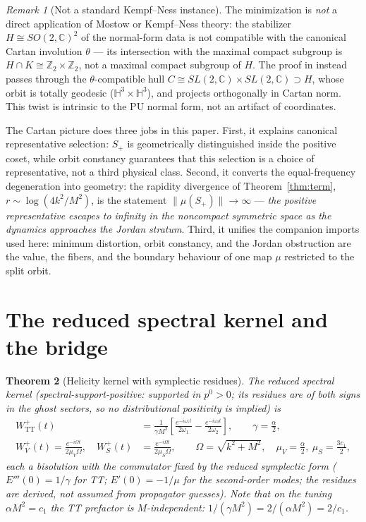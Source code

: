 \documentclass[11pt]{article}
\newtheorem{theorem}{Theorem}[section]
\theoremstyle{definition}
\theoremstyle{remark}
\newtheorem{remark}[theorem]{Remark}
\newcommand{\C}{\mathbb{C}}
\newcommand{\Z}{\mathbb{Z}}
\newcommand{\w}{\omega}
\begin{document}
\begin{remark}[Not a standard Kempf--Ness instance]\label{rem:notKN}
The minimization is \emph{not} a direct application of Mostow or
Kempf--Ness theory: the stabilizer $H\cong SO(2,\C)^2$ of the normal-form
data is not compatible with the canonical Cartan involution $\theta$ ---
its intersection with the maximal compact subgroup is
$H\cap K\cong\Z_2\times\Z_2$, not a maximal compact subgroup of $H$.  The
proof in \cite{companion2} instead passes through the $\theta$-compatible
hull $C\cong SL(2,\C)\times SL(2,\C)\supset H$, whose orbit is totally
geodesic ($\mathbb H^3\times\mathbb H^3$), and projects orthogonally in
Cartan norm.  This twist is intrinsic to the PU normal form, not an
artifact of coordinates.
\end{remark}

The Cartan picture does three jobs in this paper.  First, it explains
canonical representative selection: $S_+$ is geometrically distinguished
inside the positive coset, while orbit constancy \cite{companion3}
guarantees that this selection is a choice of representative, not a third
physical class.  Second, it converts the equal-frequency degeneration
into geometry: the rapidity divergence of
Theorem~\ref{thm:term}, $r\sim\log(4k^2/M^2)$, is the statement
$\|\mu(S_+)\|\to\infty$ --- \emph{the positive representative escapes to
infinity in the noncompact symmetric space as the dynamics approaches the
Jordan stratum}.  Third, it unifies the companion imports used here:
minimum distortion, orbit constancy, and the Jordan obstruction are the
value, the fibers, and the boundary behaviour of one map $\mu$ restricted
to the split orbit.

\section{The reduced spectral kernel and the bridge}\label{sec:kernel}

\begin{theorem}[Helicity kernel with symplectic residues]\label{thm:kernel}
The reduced spectral kernel (spectral-support-positive: supported in
$p^0>0$; its residues are of both signs in the ghost sectors, so no
distributional positivity is implied) is
\begin{align}
W^+_{\mathrm{TT}}(t)
&=\frac{1}{\gamma M^2}
\left[\frac{e^{-i\w_1t}}{2\w_1}-\frac{e^{-i\w_2t}}{2\w_2}\right],
\qquad \gamma=\frac{\alpha}{2},\\
W^+_{V}(t)=\frac{e^{-i\Omega t}}{2\mu_V\Omega},
\quad
W^+_{S}(t)&=\frac{e^{-i\Omega t}}{2\mu_S\Omega},
\qquad
\Omega=\sqrt{k^2+M^2},\quad \mu_V=\frac{\alpha}{2},\ \mu_S=\frac{3c_1}{2},
\end{align}
each a bisolution with the commutator fixed by the reduced symplectic
form ($E'''(0)=1/\gamma$ for TT; $E'(0)=-1/\mu$ for the second-order
modes; the residues are \emph{derived}, not assumed from propagator
guesses).  Note that on the tuning $\alpha M^2=c_1$ the TT prefactor is
$M$-independent: $1/(\gamma M^2)=2/(\alpha M^2)=2/c_1$.
\end{theorem}
\end{document}
